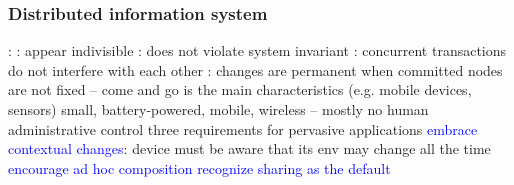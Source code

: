 \documentclass{myproc}
\begin{document}
\subsubsection{Distributed information system}
\bit
\w {}
   \bit
   \w {}:
     \bit
     \w {}: appear indivisible
     \w {}: does not violate system invariant
     \w {}: concurrent transactions do not interfere with each other
     \w {}: changes are permanent when committed
     \eit
   \eit
\w {}
  \bit
  \w {}
  \w {}
  \eit
\w {}
   \bit
   \w nodes are not fixed -- come and go
   \w {} is the main characteristics (e.g. mobile devices,
   sensors) 
   \w small, battery-powered, mobile, wireless -- mostly
   \w no human administrative control
   \w three requirements for pervasive applications 
     \ben
     \w \textcolor{blue}{embrace contextual changes}: device must be aware
     that its env may change all the time
     \w \textcolor{blue}{encourage ad hoc composition}
     \w \textcolor{blue}{recognize sharing as the default}
     \een
   \w {}
   \w {}
   \w {}
   \eit
\eit

\tableofcontents
\end{document}
